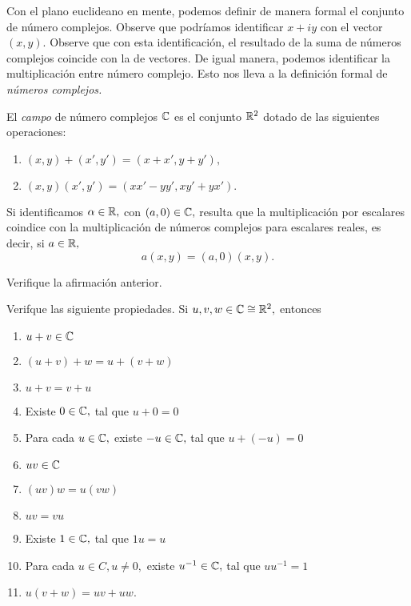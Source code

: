 Con el plano euclideano en mente, podemos definir de manera formal el conjunto de número complejos. Observe que
podríamos identificar $x+iy$ con el vector $(x,y).$ Observe que con esta identificación, el resultado de la suma de
números complejos coincide con la de vectores. De igual manera, podemos identificar la multiplicación entre número
complejo. Esto nos lleva a la definición formal de \emph{números complejos.}

\begin{defn}
	El \emph{campo} de número complejos $\mathbb{C}$ es el conjunto $\mathbb{R}^{2}$ dotado de las siguientes operaciones:
	\begin{enumerate}
		\item
		$
		(x,y)+(x',y')=(x+x',y+y'),
		$
		\item
		$
		(x,y)(x',y')=(xx'-yy',xy'+yx').
		$
	\end{enumerate}
\end{defn}


Si identificamos $\alpha \in \mathbb{R},$ con $(a,0) \in \mathbb{C},$ resulta que la multiplicación por escalares coindice con la
multiplicación de números complejos para escalares reales, es decir, si $a\in \mathbb{R},$
$$
a(x,y)=(a,0)(x,y).
$$

\begin{problema}
	Verifique la afirmación anterior.
\end{problema}


\begin{problema}
	Verifque las siguiente propiedades. Si $u,v,w \in \mathbb{C} \cong \mathbb{R}^{2},$ entonces
	\begin{enumerate}
		\item $u+v\in \mathbb{C}$ 
		\item $(u+v)+w=u+(v+w)$
		\item $u+v=v+u$
		\item Existe $0\in \mathbb{C},$ tal que $u+0=0$
		\item Para cada $u\in \mathbb{C},$ existe $-u\in\mathbb{C},$ tal que $u+(-u)=0$
		\item $uv \in \mathbb{C}$
		\item $(uv)w=u(vw)$
		\item $uv=vu$
		\item Existe $1\in \mathbb{C},$ tal que $1u=u$
		\item Para cada $u\in C, u \neq 0,$ existe $u^{-1}\in \mathbb{C},$ tal que $u u^{-1}=1$
		\item $u(v+w)=uv+uw.$
	\end{enumerate}
	
\end{problema}

